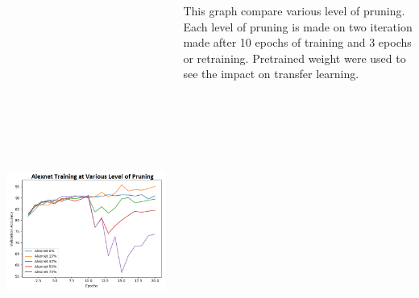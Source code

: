 \documentclass[25pt, a0paper,
               colspace=15mm, subcolspace=0mm,
               blockverticalspace=17mm,
               landscape]{tikzposter} %
\begin{document}
\begin{columns}
{\begin{center}
	\includegraphics[width=25cm, height=15cm]{figures/prune_ratio}
\end{center}

This graph compare various level of pruning. Each level of pruning is made on two iteration made after 10 epochs of training and 3 epochs or retraining. Pretrained weight were used to see the impact on transfer learning.
}

\end{columns}
\end{document}
